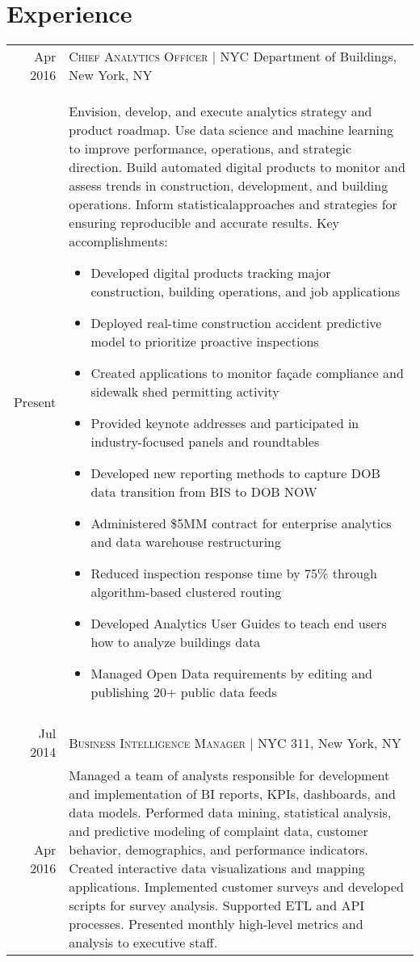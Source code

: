 \documentclass[a4paper,10pt]{article}
\begin{document}
\section{Experience}
\begin{tabular}{r|p{13cm}}
 {Apr 2016} & \textsc{Chief Analytics Officer} | NYC Department of Buildings, New York, NY \\{Present}&\footnotesize{Envision, develop, and execute analytics strategy and product roadmap. Use data science and machine learning to improve performance, operations, and strategic direction. Build automated digital products to monitor and assess trends in construction, development, and building operations. Inform statistical\hfill \break approaches and strategies for ensuring reproducible and accurate results. Key accomplishments:}
 \begin{itemize}
        \item Developed digital products tracking major construction, building operations, and job applications 
        \item Deployed real-time construction accident predictive model to prioritize proactive inspections
        \item Created applications to monitor façade compliance and sidewalk shed permitting activity
        \item Provided keynote addresses and participated in industry-focused panels and roundtables
        \item Developed new reporting methods to capture DOB data transition from BIS to DOB NOW
        \item Administered \$5MM  contract for enterprise analytics and data warehouse restructuring
	\item Reduced inspection response time by 75\% through algorithm-based clustered routing
	\item Developed Analytics User Guides to teach end users how to analyze buildings data
	\item Managed Open Data requirements by editing and publishing 20+ public data feeds
	\end{itemize}\vspace{-1.6em}\\\multicolumn{2}{c}{} \\{Jul 2014} & \textsc{Business Intelligence Manager} | NYC 311, New York, NY \\{Apr 2016}&\footnotesize{Managed a team of analysts responsible for development and implementation of BI reports, KPIs, dashboards, and data models. Performed data mining, statistical analysis, and predictive modeling of complaint data, customer behavior, demographics, and performance indicators. Created interactive data visualizations and mapping applications. Implemented customer surveys and developed scripts for survey analysis. Supported ETL and API processes. Presented monthly high-level metrics and analysis to executive staff.}

\end{tabular}
\end{document}
